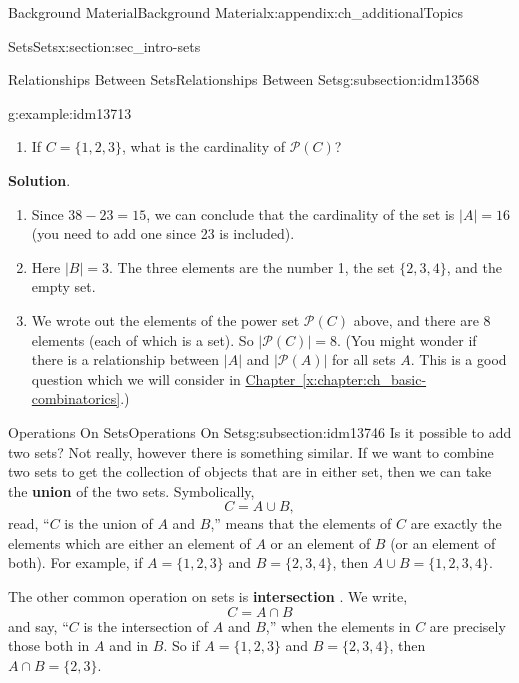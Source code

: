 \documentclass[oneside,10pt,]{book}
\newcommand{\terminology}[1]{\textbf{#1}}
\numberwithin{equation}{chapter}
\def\pow{\mathcal P}
\newcommand{\card}[1]{\left| #1 \right|}
\begin{document}
\begin{appendixptx}{Background Material}{}{Background Material}{}{}{x:appendix:ch_additionalTopics}
\begin{sectionptx}{Sets}{}{Sets}{}{}{x:section:sec_intro-sets}
\begin{subsectionptx}{Relationships Between Sets}{}{Relationships Between Sets}{}{}{g:subsection:idm13568}
\begin{example}{}{g:example:idm13713}
\begin{enumerate}
\item{}If \(C = \{1,2,3\}\), what is the cardinality of \(\pow(C)\)?%
\end{enumerate}
%
\par\smallskip%
\noindent\textbf{Solution}.\hypertarget{g:solution:idm13727}{}\quad{}%
\begin{enumerate}
\item{}Since \(38 - 23 = 15\), we can conclude that the cardinality of the set is \(|A| = 16\) (you need to add one since 23 is included).%
\item{}Here \(|B| = 3\). The three elements are the number 1, the set \(\{2,3,4\}\), and the empty set.%
\item{}We wrote out the elements of the power set \(\pow(C)\) above, and there are 8 elements (each of which is a set). So \(\card{\pow(C)} = 8\).  (You might wonder if there is a relationship between \(\card{A}\) and \(\card{\pow(A)}\) for all sets \(A\).  This is a good question which we will consider in \hyperref[x:chapter:ch_basic-combinatorics]{Chapter~\ref{x:chapter:ch_basic-combinatorics}}.)%
\end{enumerate}
%
\end{example}
\end{subsectionptx}
%
%
\typeout{************************************************}
\typeout{************************************************}
%
\begin{subsectionptx}{Operations On Sets}{}{Operations On Sets}{}{}{g:subsection:idm13746}
Is it possible to add two sets? Not really, however there is something similar. If we want to combine two sets to get the collection of objects that are in either set, then we can take the \terminology{union}  of the two sets. Symbolically,%
\begin{equation*}
C = A \cup B,
\end{equation*}
read, ``\(C\) is the union of \(A\) and \(B\),'' means that the elements of \(C\) are exactly the elements which are either an element of \(A\) or an element of \(B\) (or an element of both). For example, if \(A = \{1, 2, 3\}\) and \(B = \{2, 3, 4\}\), then \(A \cup B = \{1, 2, 3, 4\}\).%
\par
The other common operation on sets is \terminology{intersection} . We write,%
\begin{equation*}
C = A \cap B
\end{equation*}
and say, ``\(C\) is the intersection of \(A\) and \(B\),'' when the elements in \(C\) are precisely those both in \(A\) and in \(B\). So if \(A = \{1, 2, 3\}\) and \(B = \{2, 3, 4\}\), then \(A \cap B = \{2, 3\}\).%

\end{subsectionptx}
\end{sectionptx}
\end{appendixptx}
\end{document}
